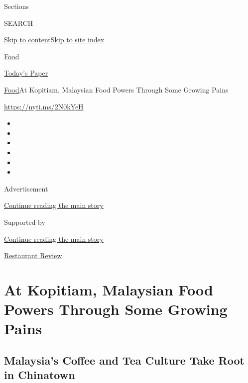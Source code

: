 Sections

SEARCH

\protect\hyperlink{site-content}{Skip to
content}\protect\hyperlink{site-index}{Skip to site index}

\href{https://www.nytimes3xbfgragh.onion/section/food}{Food}

\href{https://myaccount.nytimes3xbfgragh.onion/auth/login?response_type=cookie\&client_id=vi}{}

\href{https://www.nytimes3xbfgragh.onion/section/todayspaper}{Today's
Paper}

\href{/section/food}{Food}\textbar{}At Kopitiam, Malaysian Food Powers
Through Some Growing Pains

\url{https://nyti.ms/2N0kYeH}

\begin{itemize}
\item
\item
\item
\item
\item
\item
\end{itemize}

Advertisement

\protect\hyperlink{after-top}{Continue reading the main story}

Supported by

\protect\hyperlink{after-sponsor}{Continue reading the main story}

\href{/column/restaurant-review}{Restaurant Review}

\hypertarget{at-kopitiam-malaysian-food-powers-through-some-growing-pains}{%
\section{At Kopitiam, Malaysian Food Powers Through Some Growing
Pains}\label{at-kopitiam-malaysian-food-powers-through-some-growing-pains}}

\href{https://www.nytimes3xbfgragh.onion/slideshow/2018/09/25/dining/kopitiam-nyc.html}{}

\hypertarget{malaysias-coffee-and-tea-culture-take-root-in-chinatown}{%
\subsection{Malaysia's Coffee and Tea Culture Take Root in
Chinatown}\label{malaysias-coffee-and-tea-culture-take-root-in-chinatown}}

